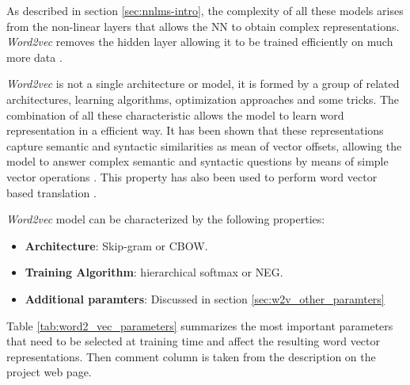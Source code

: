 As  described in section \ref{sec:nnlms-intro}, the complexity of all 
these models arises from the non-linear layers  that allows the \ac{NN} to
obtain complex representations.  \textit{Word2vec} removes the hidden layer 
allowing it to be trained efficiently on much more data  \cite{DBLP:journals/corr/abs-1301-3781}.

\textit{Word2vec} is not a single architecture or model, it is formed by a
group of related architectures, learning algorithms, optimization 
approaches and some tricks. The combination of all these characteristic
allows the model  to learn word representation in a efficient
way. It has been shown that these representations  capture semantic and syntactic
similarities as mean of vector offsets, allowing the model to answer complex
semantic and syntactic questions by means 
of simple vector operations   \cite{MikolovSCCD13}. This property  has also
been used to perform word vector based translation \cite{DBLP:journals/corr/MikolovLS13}.  

\textit{Word2vec} model can be characterized by the following properties:


\begin{itemize}
\item \textbf{Architecture}: Skip-gram or \ac{CBOW}.
\item \textbf{Training Algorithm}: hierarchical softmax  or \ac{NEG}.
\item \textbf{Additional paramters}: Discussed in section \ref{sec:w2v_other_paramters}
\end{itemize}


Table \ref{tab:word2_vec_parameters} summarizes the most important parameters
that need to be selected at training time
and affect the resulting word vector representations. Then comment column is
taken from the description  on the project web page.


